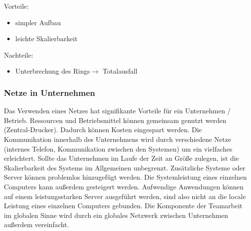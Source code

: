 \documentclass[12pt,a4paper]{article}
\begin{document}
\begin{minipage}[t]{.48\textwidth}
\begin{flushright}
        \end{flushright}
        \small Vorteile:
        \begin{itemize}
            \small
            \item simpler Aufbau
            \item leichte Skalierbarkeit
            \end{itemize}
            \small Nachteile:
            \begin{itemize}
                \small
                \item Unterbrechung des Rings\newline $\longrightarrow$ Totalausfall
                \end{itemize}
	\end{minipage}

\subsubsection{Netze in Unternehmen}
    Das Verwenden eines Netzes hat signifikante Vorteile für ein Unternehmen / Betrieb. Ressourcen und Betriebsmittel können gemeinsam genutzt werden (Zentral-Drucker). Dadurch können Kosten eingespart werden. Die Kommunikation innerhalb des Unternehmens wird durch verschiedene Netze (internes Telefon, Kommunikation zwischen den Systemen) um ein vielfaches erleichtert. Sollte das Unternehmen im Laufe der Zeit an Größe zulegen, ist die Skalierbarkeit des Systems im Allgemeinen unbegrenzt. Zusätzliche Systeme oder Server können problemlos hinzugefügt werden. Die Systemleistung eines einzelnen Computers kann außerdem gesteigert werden. Aufwendige Anwendungen können auf einem leistungsstarken Server ausgeführt werden, sind also nicht an die locale Leistung eines einzelnen Computers gebunden. Die Komponente der Teamarbeit im globalen Sinne wird durch ein globales Netzwerk zwischen Unternehmen außerdem vereinfacht.
\end{document}

